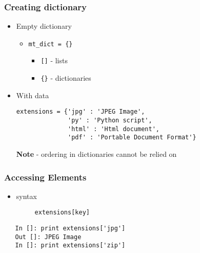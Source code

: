 \documentclass[presentation]{beamer}
\begin{document}
\begin{frame}[fragile]
\frametitle{Creating dictionary}
\label{sec-3}

\begin{itemize}
\item Empty dictionary

\begin{itemize}
\item \texttt{mt\_dict = \{\}}

\begin{itemize}
\item \texttt{[]} - lists
\item \texttt{\{\}} - dictionaries
\end{itemize}

\end{itemize}

\item With data
\begin{verbatim}
extensions = {'jpg' : 'JPEG Image', 
              'py' : 'Python script',
              'html' : 'Html document', 
              'pdf' : 'Portable Document Format'}
\end{verbatim}

   \textbf{Note} - ordering in dictionaries cannot be relied on
\end{itemize}
\end{frame}
\begin{frame}[fragile]
\frametitle{Accessing Elements}
\label{sec-4}

\begin{itemize}
\item syntax
\begin{verbatim}
     extensions[key]
\end{verbatim}

\end{itemize}

  
\begin{verbatim}
   In []: print extensions['jpg']
   Out []: JPEG Image
   In []: print extensions['zip']
\end{verbatim}
\end{frame}
\end{document}
